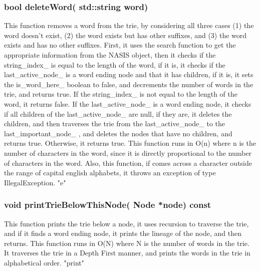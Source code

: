 \documentclass[a4paper]{article}
\begin{document}
\subsubsection{{\color{orange}bool} {\color{draculapurple}deleteWord}({\color{orange} std::string} word)}
This function removes a word from the trie, by considering all three cases (1) the word doesn't exist, (2) the word exists but has other suffixes, and (3) the word exists and has no other suffixes. 
First, it uses the {\color{draculapurple}search} function to get the appropriate information from the NASIS object, then it checks if the {\color{draculapurple}string\_index\_} 
is equal to the length of the word, if it is, it checks if the {\color{draculapurple}last\_active\_node\_} is a word ending node and that it has children, 
if it is, it sets the {\color{draculapurple}is\_word\_here\_} boolean to false, and decrements the number of words in the trie, and returns true. If the {\color{draculapurple}string\_index\_} 
is not equal to the length of the word, it returns false. If the {\color{draculapurple}last\_active\_node\_} is a word ending node, it checks if all children of the 
{\color{draculapurple}last\_active\_node\_} are null, if they are, it deletes the children, and then traverses the trie from the {\color{draculapurple}last\_active\_node\_} 
to the {\color{draculapurple}last\_important\_node\_}  , and deletes the nodes that have no children, and returns true. Otherwise, it returns true. This function runs in 
{\color{lightblue}O(n)} where {\color{lightblue}n} is the number of characters in the word, since it is directly proportional to the number of characters in the word.
Also, this function, if comes across a character outside the range of capital english alphabets, it throws an exception of type {\color{orange}IllegalException}.
{\color{GoldenYellow}"e"}

\subsubsection{{\color{orange}void} {\color{draculapurple}printTrieBelowThisNode}({\color{orange} Node} *node) {\color{GoldenYellow} const}}
This function prints the trie below a node, it uses recursion to traverse the trie, and if it finds a word ending node, it prints the lineage of the node, and then returns. This function runs in {\color{lightblue}O(N)} where {\color{lightblue}N} is the number of words in the trie.
It traverses the trie in a Depth First manner, and prints the words in the trie in alphabetical order.
{\color{GoldenYellow}"print"}
\end{document}
